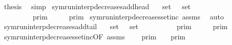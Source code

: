 \begin{isabellebody}
\ {\isacharquery}thesis\ \isamarkupfalse%
\ simp\isanewline
{}\isamarkupfalse%
%
\endisatagproof
{\isafoldproof}%
%
\isadelimproof
\isanewline
%
\endisadelimproof
\isanewline
{}\isamarkupfalse%
\ symrun{\isacharunderscore}interp{\isacharunderscore}decreases{\isacharunderscore}add{\isacharunderscore}head{\isacharcolon}\isanewline
\ \ \ {\isacartoucheopen}set\ {\isasymGamma}\ {\isasymsubseteq}\ set\ {\isasymGamma}{\isacharprime}{\isacartoucheclose}\isanewline
\ \ \ \ \ {\isacartoucheopen}{\isasymlbrakk}{\isasymlbrakk}\ {\isasymgamma}\ {\isacharhash}\ {\isasymGamma}\ {\isasymrbrakk}{\isasymrbrakk}\isactrlsub p\isactrlsub r\isactrlsub i\isactrlsub m\ {\isasymsupseteq}\ {\isasymlbrakk}{\isasymlbrakk}\ {\isasymgamma}\ {\isacharhash}\ {\isasymGamma}{\isacharprime}\ {\isasymrbrakk}{\isasymrbrakk}\isactrlsub p\isactrlsub r\isactrlsub i\isactrlsub m{\isacartoucheclose}\isanewline
%
\isadelimproof
%
\endisadelimproof
%
\isatagproof
{}\isamarkupfalse%
\ symrun{\isacharunderscore}interp{\isacharunderscore}decreases{\isacharunderscore}setinc\ assms\ \isamarkupfalse%
\ auto%
\endisatagproof
{\isafoldproof}%
%
\isadelimproof
\isanewline
%
\endisadelimproof
\isanewline
{}\isamarkupfalse%
\ symrun{\isacharunderscore}interp{\isacharunderscore}decreases{\isacharunderscore}add{\isacharunderscore}tail{\isacharcolon}\isanewline
\ \ \ {\isacartoucheopen}set\ {\isasymGamma}\ {\isasymsubseteq}\ set\ {\isasymGamma}{\isacharprime}{\isacartoucheclose}\isanewline
\ \ \ \ \ {\isacartoucheopen}{\isasymlbrakk}{\isasymlbrakk}\ {\isasymGamma}\ {\isacharat}\ {\isacharbrackleft}{\isasymgamma}{\isacharbrackright}\ {\isasymrbrakk}{\isasymrbrakk}\isactrlsub p\isactrlsub r\isactrlsub i\isactrlsub m\ {\isasymsupseteq}\ {\isasymlbrakk}{\isasymlbrakk}\ {\isasymGamma}{\isacharprime}\ {\isacharat}\ {\isacharbrackleft}{\isasymgamma}{\isacharbrackright}\ {\isasymrbrakk}{\isasymrbrakk}\isactrlsub p\isactrlsub r\isactrlsub i\isactrlsub m{\isacartoucheclose}\isanewline
%
\isadelimproof
%
\endisadelimproof
%
\isatagproof
{}\isamarkupfalse%
\ {\isacharminus}\isanewline
\ \ \isamarkupfalse%
\ symrun{\isacharunderscore}interp{\isacharunderscore}decreases{\isacharunderscore}setinc{\isacharbrackleft}OF\ assms{\isacharbrackright}\ \isamarkupfalse%
\ {\isacartoucheopen}{\isasymlbrakk}{\isasymlbrakk}\ {\isasymGamma}{\isacharprime}\ {\isasymrbrakk}{\isasymrbrakk}\isactrlsub p\isactrlsub r\isactrlsub i\isactrlsub m\ {\isasymsubseteq}\ {\isasymlbrakk}{\isasymlbrakk}\ {\isasymGamma}\ {\isasymrbrakk}{\isasymrbrakk}\isactrlsub p\isactrlsub r\isactrlsub i\isactrlsub m{\isacartoucheclose}\ \isacommand{{\isachardot}}\isamarkupfalse%

\end{isabellebody}
